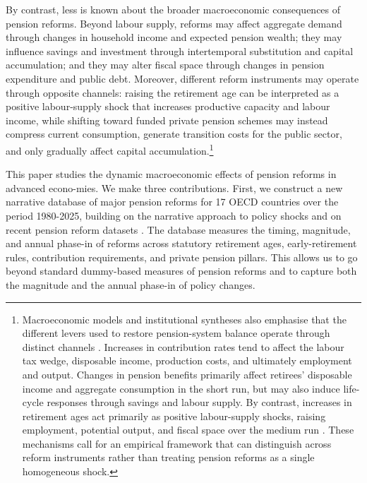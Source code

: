 \documentclass[11pt,english,a4paper, twoside, authoryear]{article}
\begin{document}
By contrast, less is known about the broader macroeconomic consequences of pension reforms. Beyond labour supply, reforms may affect aggregate demand through changes in household income and expected pension wealth; they may influence savings and investment through intertemporal substitution and capital accumulation; and they may alter fiscal space through changes in pension expenditure and public debt. Moreover, different reform instruments may operate through opposite channels: raising the retirement age can be interpreted as a positive labour-supply shock that increases productive capacity and labour income, while shifting toward funded private pension schemes may instead compress current consumption, generate transition costs for the public sector, and only gradually affect capital accumulation.\footnote{Macroeconomic models and institutional syntheses also emphasise that the different levers used to restore pension-system balance operate through distinct channels \citep{COR2026MacroLeviers}. Increases in contribution rates tend to affect the labour tax wedge, disposable income, production costs, and ultimately employment and output. Changes in pension benefits primarily affect retirees’ disposable income and aggregate consumption in the short run, but may also induce life-cycle responses through savings and labour supply. By contrast, increases in retirement ages act primarily as positive labour-supply shocks, raising employment, potential output, and fiscal space over the medium run \citep{HvidingMerette1998, KaramMuirPereiraTuladhar2010, Morgavi2024, COR2026MacroLeviers}. These mechanisms call for an empirical framework that can distinguish across reform instruments rather than treating pension reforms as a single homogeneous shock.}

This paper studies the dynamic macroeconomic effects of pension reforms in advanced econo-mies. We make three contributions. First, we construct a new narrative database of major pension reforms for 17 OECD countries over the period 1980-2025, building on the narrative approach to policy shocks and on recent pension reform datasets \citep{Ramey2009, RomerRomer2010, Beetsma2020, BiZubairy2023, romp_political_2024}. The database measures the timing, magnitude, and annual phase-in of reforms across statutory retirement ages, early-retirement rules, contribution requirements, and private pension pillars. This allows us to go beyond standard dummy-based measures of pension reforms and to capture both the magnitude and the annual phase-in of policy changes.
\end{document}
